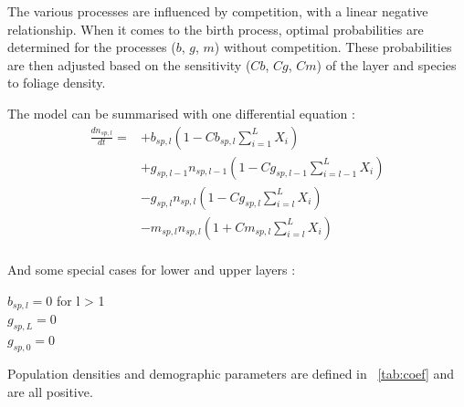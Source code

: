 \documentclass{article}
\begin{document}
The various processes are influenced by competition, with a linear negative relationship. When it comes to the birth process, optimal probabilities are determined for the processes ($b$, $g$, $m$) without competition. These probabilities are then adjusted based on the sensitivity ($Cb$, $Cg$, $Cm$) of the layer and species to foliage density.

\noindent The model can be summarised with one differential equation : \\
\begin{equation}\label{eq:model_general}
    \begin{split}
    \frac{dn_{sp,l}}{dt} = & 
    + b_{sp,l} (1 - Cb_{sp,l} \sum_{i = 1}^{L} X_{i}) \\
    & + g_{sp,l - 1} n_{sp,l-1} (1 - Cg_{sp,l-1} \sum_{i = l-1}^{L} X_{i}) \\
    & - g_{sp,l} n_{sp,l} (1 - Cg_{sp,l} \sum_{i = l}^{L} X_{i}) \\
    & - m_{sp,l} n_{sp,l}(1 + Cm_{sp,l} \sum_{i = l}^{L} X_{i})
    \end{split}
\end{equation}
\\
And some special cases for lower and upper layers : \\
\begin{center}
    $b_{sp,l} = 0$ for l > 1 \\
    $g_{sp,L} = 0$ \\
    $g_{sp,0} = 0$
\end{center}

Population densities and demographic parameters are defined in ~\ref{tab:coef} and are all positive.
\end{document}
